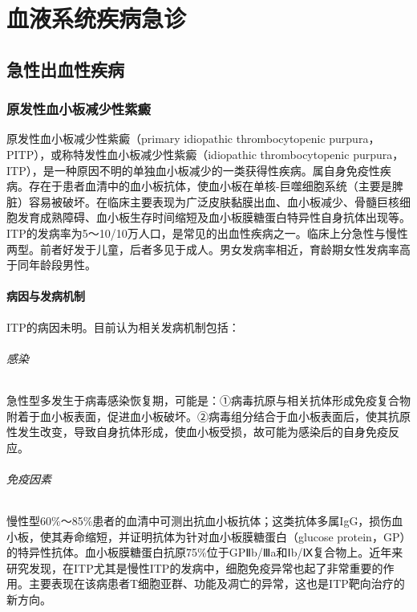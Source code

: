 \part{血液系统疾病急诊}

\chapter{急性出血性疾病}

\section{原发性血小板减少性紫癜}

原发性血小板减少性紫癜（primary idiopathic thrombocytopenic
purpura，PITP），或称特发性血小板减少性紫癜（idiopathic thrombocytopenic
purpura，ITP），是一种原因不明的单独血小板减少的一类获得性疾病。属自身免疫性疾病。存在于患者血清中的血小板抗体，使血小板在单核-巨噬细胞系统（主要是脾脏）容易被破坏。在临床主要表现为广泛皮肤黏膜出血、血小板减少、骨髓巨核细胞发育成熟障碍、血小板生存时间缩短及血小板膜糖蛋白特异性自身抗体出现等。ITP的发病率为5～10/10万人口，是常见的出血性疾病之一。临床上分急性与慢性两型。前者好发于儿童，后者多见于成人。男女发病率相近，育龄期女性发病率高于同年龄段男性。

\subsection{病因与发病机制}

ITP的病因未明。目前认为相关发病机制包括：

\paragraph{感染}

急性型多发生于病毒感染恢复期，可能是：①病毒抗原与相关抗体形成免疫复合物附着于血小板表面，促进血小板破坏。②病毒组分结合于血小板表面后，使其抗原性发生改变，导致自身抗体形成，使血小板受损，故可能为感染后的自身免疫反应。

\paragraph{免疫因素}

慢性型60\%～85\%患者的血清中可测出抗血小板抗体；这类抗体多属IgG，损伤血小板，使其寿命缩短，并证明抗体为针对血小板膜糖蛋白（glucose
protein，GP）的特异性抗体。血小板膜糖蛋白抗原75\%位于GPⅡb/Ⅲa和Ⅰb/Ⅸ复合物上。近年来研究发现，在ITP尤其是慢性ITP的发病中，细胞免疫异常也起了非常重要的作用。主要表现在该病患者T细胞亚群、功能及凋亡的异常，这也是ITP靶向治疗的新方向。

